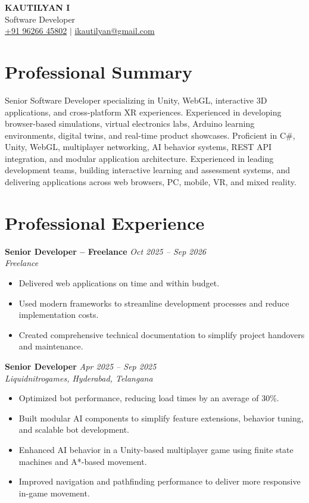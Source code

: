 \documentclass[a4paper,10pt]{article}
\newcommand{\experience}[4]{
    \textbf{#1} \hfill \textit{#2}\\
    \textit{#3}\\[-3pt]
    #4
    \vspace{3pt}
}
\begin{document}
\begin{center}
    {\LARGE\bfseries KAUTILYAN I}\\[4pt]
    {\large Software Developer}\\[5pt]
    \href{tel:+919626645802}{+91 96266 45802}
    \quad $|$ \quad
    \href{mailto:ikautilyan@gmail.com}{ikautilyan@gmail.com}
\end{center}

\section{Professional Summary}

Senior Software Developer specializing in Unity, WebGL, interactive
3D applications, and cross-platform XR experiences. Experienced in
developing browser-based simulations, virtual electronics labs,
Arduino learning environments, digital twins, and real-time product
showcases. Proficient in C\#, Unity, WebGL, multiplayer networking,
AI behavior systems, REST API integration, and modular application
architecture. Experienced in leading development teams, building
interactive learning and assessment systems, and delivering
applications across web browsers, PC, mobile, VR, and mixed reality.

\section{Professional Experience}

\experience
{Senior Developer -- Freelance}
{Oct 2025 -- Sep 2026}
{Freelance}
{
\begin{itemize}
    \item Delivered web applications on time and within budget.
    \item Used modern frameworks to streamline development processes
          and reduce implementation costs.
    \item Created comprehensive technical documentation to simplify
          project handovers and maintenance.
\end{itemize}
}

\experience
{Senior Developer}
{Apr 2025 -- Sep 2025}
{Liquidnitrogames, Hyderabad, Telangana}
{
\begin{itemize}
    \item Optimized bot performance, reducing load times by an average
          of 30\%.
    \item Built modular AI components to simplify feature extensions,
          behavior tuning, and scalable bot development.
    \item Enhanced AI behavior in a Unity-based multiplayer game using
          finite state machines and A*-based movement.
    \item Improved navigation and pathfinding performance to deliver
          more responsive in-game movement.
\end{itemize}
}
\end{document}
